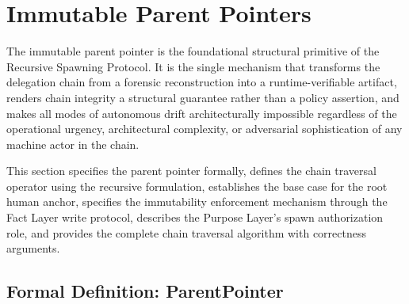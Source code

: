 \section{Immutable Parent Pointers}
\label{sec:immutable-parent-pointers}

The immutable parent pointer is the foundational structural primitive of the Recursive Spawning Protocol. It is the single mechanism that transforms the delegation chain from a forensic reconstruction into a runtime-verifiable artifact, renders chain integrity a structural guarantee rather than a policy assertion, and makes all modes of autonomous drift architecturally impossible regardless of the operational urgency, architectural complexity, or adversarial sophistication of any machine actor in the chain.

This section specifies the parent pointer formally, defines the chain traversal operator using the recursive formulation, establishes the base case for the root human anchor, specifies the immutability enforcement mechanism through the Fact Layer write protocol, describes the Purpose Layer's spawn authorization role, and provides the complete chain traversal algorithm with correctness arguments.

\subsection{Formal Definition: ParentPointer}
\label{sec:parent-pointer-definition}

